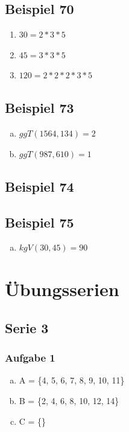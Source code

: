 \documentclass[12pt, a4paper, oneside]{article}
\begin{document}
\subsection{Beispiel 70}
\begin{enumerate}[$\bullet$]
  \item $30 = 2 * 3 * 5$
  \item $45 = 3 * 3 * 5$
  \item $120 = 2 * 2 * 2 * 3 * 5$
\end{enumerate}

\subsection{Beispiel 73}
\begin{enumerate}[(a)]
  \item $ggT(1564, 134) = 2$
  \item $ggT(987, 610) = 1$
\end{enumerate}

\subsection{Beispiel 74}

\subsection{Beispiel 75} 
\begin{enumerate}[(a)]
  \item $kgV(30, 45) = 90$
\end{enumerate}

\newpage
\section{Übungsserien}
\subsection{Serie 3}
\subsubsection{Aufgabe 1}
\begin{enumerate}[(a)]
  \item A = \{4, 5, 6, 7, 8, 9, 10, 11\}
  \item B = \{2, 4, 6, 8, 10, 12, 14\}
  \item C = \{\}
\end{enumerate}
\end{document}
